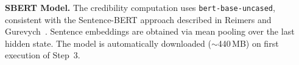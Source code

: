 \smallskip\noindent\textbf{SBERT Model.} The credibility computation uses \texttt{bert-base-uncased}, consistent with the Sentence-BERT approach described in Reimers and Gurevych~\cite{reimers2019sbert}. Sentence embeddings are obtained via mean pooling over the last hidden state. The model is automatically downloaded (${\sim}$440\,MB) on first execution of Step~3.
